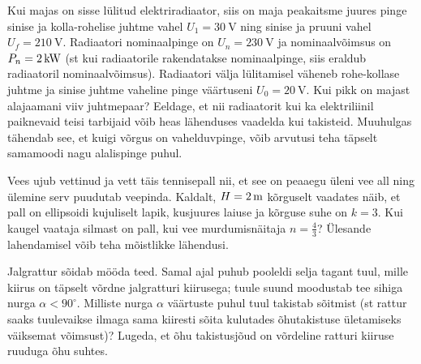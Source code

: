 \documentclass[10pt]{article}
\begin{document}
Kui majas on sisse lülitud  elektriradiaator, siis on maja peakaitsme juures pinge sinise ja kolla-rohelise juhtme vahel $U_1=\SI{30}\V$  ning sinise ja pruuni vahel $U_f=\SI{210}\V$. Radiaatori nominaalpinge on $U_n=\SI{230}\V$ ja nominaalvõimsus on $P_n=\SI 2{\kW}$ (st kui radiaatorile rakendatakse nominaalpinge, siis eraldub radiaatoril nominaalvõimsus). Radiaatori välja lülitamisel väheneb rohe-kollase juhtme ja sinise juhtme vaheline pinge väärtuseni $U_0=\SI{20}\V$. Kui pikk on majast alajaamani viiv juhtmepaar? Eeldage, et nii radiaatorit kui ka elektriliinil paiknevaid teisi tarbijaid võib heas lähenduses vaadelda kui takisteid. Muuhulgas tähendab see, et kuigi võrgus on vahelduvpinge, võib arvutusi teha täpselt samamoodi nagu alalispinge puhul.
\probend
\bigskip


Vees ujub vettinud ja vett täis tennisepall nii, et see on peaaegu üleni vee all ning ülemine serv puudutab veepinda. Kaldalt, $H=\SI 2\m$ kõrguselt vaadates näib, et pall on ellipsoidi kujuliselt lapik, kusjuures laiuse ja kõrguse suhe on $k=3$. Kui kaugel vaataja silmast on pall, kui vee murdumisnäitaja $n=\frac 43$? Ülesande lahendamisel võib teha mõistlikke lähendusi.
\probend
\bigskip


Jalgrattur sõidab mööda teed.  Samal ajal puhub pooleldi selja tagant tuul, mille kiirus on täpselt võrdne jalgratturi kiirusega; tuule suund moodustab tee sihiga nurga $\alpha<90^\circ$. Milliste nurga $\alpha$ väärtuste puhul tuul takistab sõitmist (st rattur saaks tuulevaikse ilmaga sama kiiresti sõita kulutades õhutakistuse ületamiseks väiksemat võimsust)? Lugeda, et õhu takistusjõud on võrdeline ratturi kiiruse ruuduga õhu suhtes.
\probend
\bigskip

\end{document}
